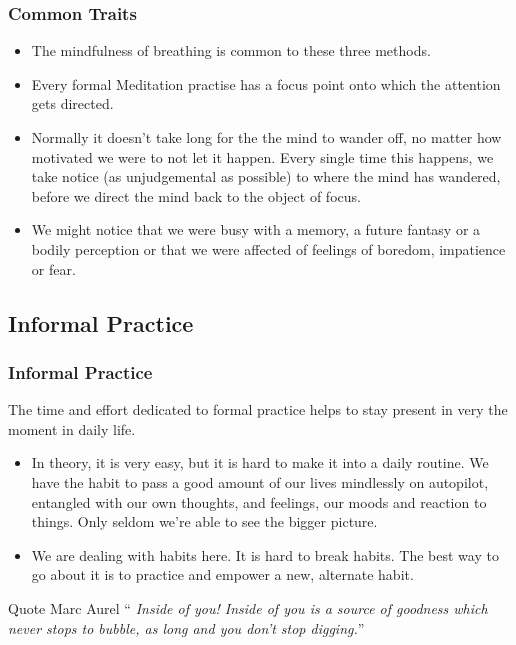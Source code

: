 \begin{itemize}
\begin{frame}
\frametitle{Common Traits}
\begin{itemize}
\item The {mindfulness of breathing} is common to these three methods.
\item Every formal Meditation practise has a {focus point} onto which the attention gets directed.
\item Normally it doesn't take long for the the {mind to wander off}, no matter how motivated we were to not let it happen. Every single time this happens, we {take notice} (as unjudgemental as possible) to where the mind has wandered, before we direct the mind {back to the object of focus}.
\item We might notice that we were busy with a memory, a future fantasy or a bodily perception or that we were affected of feelings of boredom, impatience or fear.
\end{itemize}
\end{frame}

\subsection{Informal Practice}
\begin{frame}
\frametitle{Informal Practice}
The time and effort dedicated to formal practice helps to {stay present} in very the moment in daily life. 

\begin{itemize}
\item  In theory, it is very easy, but it is hard to make it into a {daily routine}. We have the habit to pass a good amount of our lives mindlessly on {autopilot}, entangled with our own thoughts, and feelings, our moods and reaction to things. Only seldom we're able to see the bigger picture.
\item We are dealing with {habits} here. It is hard to break habits. The best way to go about it is to practice and {empower a new, alternate habit}.
\end{itemize}
\begin{block}{Quote Marc Aurel}
``\textit{ Inside of you! Inside of you is a source of goodness which never stops to bubble, as long and you don't stop digging.}''
\end{block}
\end{frame}


\end{itemize}
